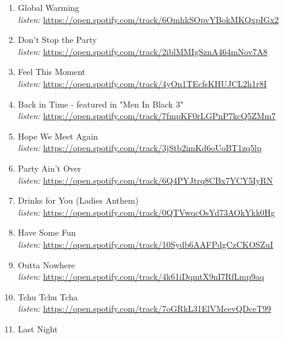 \documentclass{article}
\begin{document}
    \begin{enumerate}
                      \item Global Warming\\
            \textit{listen:}
              \underline{ https://open.spotify.com/track/6OmhkSOpvYBokMKQxpIGx2 }
                      \item Don't Stop the Party\\
            \textit{listen:}
              \underline{ https://open.spotify.com/track/2iblMMIgSznA464mNov7A8 }
                      \item Feel This Moment\\
            \textit{listen:}
              \underline{ https://open.spotify.com/track/4yOn1TEcfsKHUJCL2h1r8I }
                      \item Back in Time - featured in "Men In Black 3"\\
            \textit{listen:}
              \underline{ https://open.spotify.com/track/7fmpKF0rLGPnP7kcQ5ZMm7 }
                      \item Hope We Meet Again\\
            \textit{listen:}
              \underline{ https://open.spotify.com/track/3jStb2imKd6oUoBT1zq5lp }
                      \item Party Ain't Over\\
            \textit{listen:}
              \underline{ https://open.spotify.com/track/6Q4PYJtrq8CBx7YCY5IyRN }
                      \item Drinks for You (Ladies Anthem)\\
            \textit{listen:}
              \underline{ https://open.spotify.com/track/0QTVwqcOsYd73AOkYkk0Hg }
                      \item Have Some Fun\\
            \textit{listen:}
              \underline{ https://open.spotify.com/track/10Sydb6AAFPdgCzCKOSZuI }
                      \item Outta Nowhere\\
            \textit{listen:}
              \underline{ https://open.spotify.com/track/4k61iDqmtX9nI7RfLmp9aq }
                      \item Tchu Tchu Tcha\\
            \textit{listen:}
              \underline{ https://open.spotify.com/track/7oGRkL31ElVMcevQDceT99 }
                      \item Last Night\\

\end{enumerate}
\end{document}
